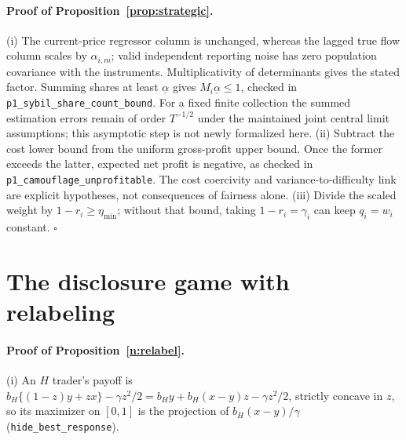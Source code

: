 \documentclass[12pt]{article}
\theoremstyle{definition}
\theoremstyle{remark}
\begin{document}
\paragraph{Proof of Proposition~\ref{prop:strategic}.}
 (i) The current-price regressor column is unchanged, whereas the lagged true flow column scales by $\alpha_{i,m}$; valid independent reporting noise has zero population covariance with the instruments. Multiplicativity of determinants gives the stated factor. Summing shares at least $\underline\alpha$ gives $M_i\underline\alpha\le1$, checked in \nolinkurl{p1_sybil_share_count_bound}. For a fixed finite collection the summed estimation errors remain of order $T^{-1/2}$ under the maintained joint central limit assumptions; this asymptotic step is not newly formalized here. (ii) Subtract the cost lower bound from the uniform gross-profit upper bound. Once the former exceeds the latter, expected net profit is negative, as checked in \nolinkurl{p1_camouflage_unprofitable}. The cost coercivity and variance-to-difficulty link are explicit hypotheses, not consequences of fairness alone. (iii) Divide the scaled weight by $1-r_i\ge\eta_{\min}$; without that bound, taking $1-r_i=\gamma_i$ can keep $q_i=w_i$ constant. $\square$

\section{The disclosure game with relabeling}\label{app:relabel}

\paragraph{Proof of Proposition~\ref{n:relabel}.} (i) An $H$ trader's payoff is $b_H\{(1-z)y+zx\}-\gamma z^2/2=b_Hy+b_H(x-y)z-\gamma z^2/2$, strictly concave in $z$, so its maximizer on $[0,1]$ is the projection of $b_H(x-y)/\gamma$ (\nolinkurl{hide_best_response}).
\end{document}
